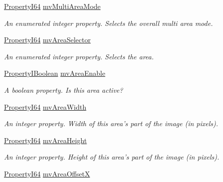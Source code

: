 \begin{DoxyCompactItemize}
\hyperlink{group___common_interface_ga81749b2696755513663492664a18a893}{Property\+I64} \hyperlink{classmv_i_m_p_a_c_t_1_1acquire_1_1_gen_i_cam_1_1_image_format_control_ace1cd2b204ca9e46d5408f2d1fff86d8}{mv\+Multi\+Area\+Mode}
\begin{DoxyCompactList}\small\item\em An enumerated integer property. Selects the overall multi area mode. \end{DoxyCompactList}\item 
\hyperlink{group___common_interface_ga81749b2696755513663492664a18a893}{Property\+I64} \hyperlink{classmv_i_m_p_a_c_t_1_1acquire_1_1_gen_i_cam_1_1_image_format_control_ae1672002a8299739cf2253de54bab577}{mv\+Area\+Selector}
\begin{DoxyCompactList}\small\item\em An enumerated integer property. Selects the area. \end{DoxyCompactList}\item 
\hyperlink{group___common_interface_ga44f9437e24b21b6c93da9039ec6786aa}{Property\+I\+Boolean} \hyperlink{classmv_i_m_p_a_c_t_1_1acquire_1_1_gen_i_cam_1_1_image_format_control_a67272b208d0d914f46877d65a66c95f3}{mv\+Area\+Enable}
\begin{DoxyCompactList}\small\item\em A boolean property. Is this area active? \end{DoxyCompactList}\item 
\hyperlink{group___common_interface_ga81749b2696755513663492664a18a893}{Property\+I64} \hyperlink{classmv_i_m_p_a_c_t_1_1acquire_1_1_gen_i_cam_1_1_image_format_control_a6804a01fa7faa08f73491fb0aa1d7c05}{mv\+Area\+Width}
\begin{DoxyCompactList}\small\item\em An integer property. Width of this area's part of the image (in pixels). \end{DoxyCompactList}\item 
\hyperlink{group___common_interface_ga81749b2696755513663492664a18a893}{Property\+I64} \hyperlink{classmv_i_m_p_a_c_t_1_1acquire_1_1_gen_i_cam_1_1_image_format_control_af3bc8fc4c97d3c668a504fec6b990b1b}{mv\+Area\+Height}
\begin{DoxyCompactList}\small\item\em An integer property. Height of this area's part of the image (in pixels). \end{DoxyCompactList}\item 
\hyperlink{group___common_interface_ga81749b2696755513663492664a18a893}{Property\+I64} \hyperlink{classmv_i_m_p_a_c_t_1_1acquire_1_1_gen_i_cam_1_1_image_format_control_a78f0647bc26627d3b47d3600beca1586}{mv\+Area\+Offset\+X}

\end{DoxyCompactItemize}
